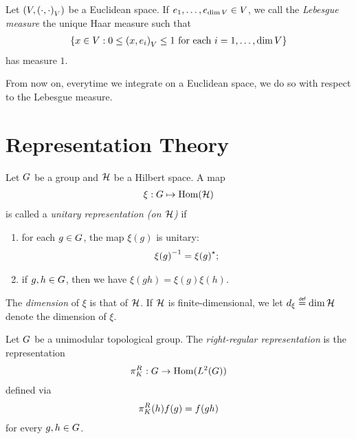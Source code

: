 \begin{definition}
\label{definition:Lebesgue_measure}
    Let $(V, {\left(\cdot, \cdot\right)_{V}})$ be a Euclidean space.
    If $e_1, \dots, e_{\dim V} \in V$,
    we call the \emph{Lebesgue measure} the unique Haar measure such that
    \begin{align*}
        \{ x \in V : 0 \leq {\left(x, e_i\right)_{V}} \leq 1 \text{ for each } i = 1, \dots, \dim V \}
    \end{align*}
    has measure $1$.
\end{definition}

From now on,
everytime we integrate on a Euclidean space,
we do so with respect to the Lebesgue measure.

\section{Representation Theory}

\begin{definition}
\label{definition:unitary_representation}
    Let $G$ be a group and $\mathcal{H}$ be a Hilbert space.
    A map
    \begin{align*}
        \xi : G \mapsto \operatorname{Hom}(\mathcal{H})
    \end{align*}
    is called a \emph{unitary representation (on $\mathcal{H}$)} if
    \begin{enumerate}
        \item for each $g \in G$, the map $\xi(g)$ is unitary:
            \begin{align*}
                {\xi(g)}^{-1} = {\xi(g)}^\star;
            \end{align*}
        \item if $g, h \in G$, then we have $\xi(g h) = \xi(g) \xi(h)$.
    \end{enumerate}

    The \emph{dimension} of $\xi$ is that of $\mathcal{H}$.
    If $\mathcal{H}$ is finite-dimensional,
    we let $\dimRep{\xi} \defeq \dim{\Hil}$ denote the dimension of $\xi$.
\end{definition}

\begin{example}
    Let $G$ be a unimodular topological group.
    The \emph{right-regular representation} is the representation
    \begin{align*}
        \pi^R_{K} : G \to \operatorname{Hom}({L^{2} (G)})
    \end{align*}
    defined via
    \begin{align*}
        \pi^R_{K}(h) f(g) = f(g h)
    \end{align*}
    for every $g, h \in G$.
\end{example}

